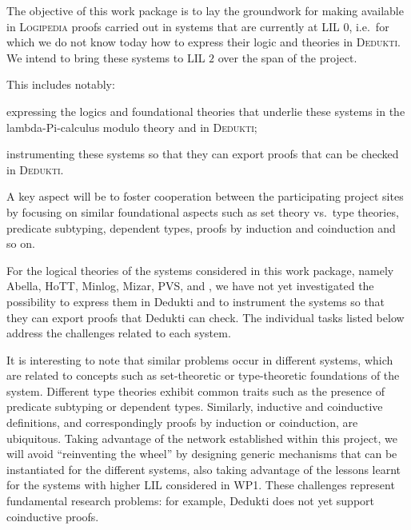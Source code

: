 \begin{workpackage}[id=theories,wphases=0-48,type=RTD,
  short=Theories in Dedukti,%
  title= Defining theories in Dedukti,
  lead=Inn,
  InnRM=10]



\begin{wpobjectives}
  The objective of this work package is to lay the groundwork for making
  available in \textsc{Logipedia} proofs carried out in systems that are
  currently at LIL $0$, i.e.\ for which we do not know today how to express
  their logic and theories in \textsc{Dedukti}. We intend to bring these systems
  to LIL $2$ over the span of the project.

This includes notably:
  \begin{compactitem}
  \item expressing the logics and foundational theories that underlie these
    systems in the lambda-Pi-calculus modulo theory and in \textsc{Dedukti};
  \item instrumenting these systems so that they can export proofs that can be
    checked in \textsc{Dedukti}.
  \end{compactitem}
  A key aspect will be to foster cooperation between the participating project
  sites by focusing on similar foundational aspects such as set theory vs.\ type
  theories, predicate subtyping, dependent types, proofs by induction and
  coinduction and so on.
\end{wpobjectives}

\begin{wpdescription}
  For the logical theories of the systems considered in this work package,
  namely Abella, HoTT, Minlog, Mizar, PVS, and \tlaplus, we have not yet
  investigated the possibility to express them in Dedukti and to instrument the
  systems so that they can export proofs that Dedukti can check. The individual
  tasks listed below address the challenges related to each system.

  It is interesting to note that similar problems occur in different systems,
  which are related to concepts such as set-theoretic or type-theoretic
  foundations of the system. Different type theories exhibit common traits such
  as the presence of predicate subtyping or dependent types. Similarly,
  inductive and coinductive definitions, and correspondingly proofs by induction
  or coinduction, are ubiquitous. Taking advantage of the network established
  within this project, we will avoid ``reinventing the wheel'' by designing
  generic mechanisms that can be instantiated for the different systems, also
  taking advantage of the lessons learnt for the systems with higher LIL
  considered in WP1. These challenges represent fundamental research problems:
  for example, Dedukti does not yet support coinductive proofs.
\end{wpdescription}


\end{workpackage}

